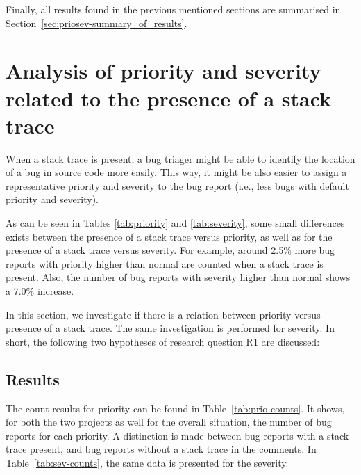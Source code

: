 Finally, all results found in the previous mentioned sections are summarised in Section~\ref{sec:priosev-summary_of_results}.

\section{Analysis of priority and severity related to the presence of a stack trace} %
\label{sec:analysis_of_priority_and_severity_related_to_the_presence_of_a_stack_trace}
When a stack trace is present, a bug triager might be able to identify the location of a bug in source code more easily. This way, it might be also easier to assign a representative priority and severity to the bug report (i.e., less bugs with default priority and severity).

As can be seen in Tables \ref{tab:priority} and \ref{tab:severity}, some small differences exists between the presence of a stack trace versus priority, as well as for the presence of a stack trace versus severity. For example, around 2.5\% more bug reports with priority higher than normal are counted when a stack trace is present. Also, the number of bug reports with severity higher than normal shows a 7.0\% increase.

In this section, we investigate if there is a relation between priority versus presence of a stack trace. The same investigation is performed for severity. In short, the following two hypotheses of research question R1 are discussed: 

\vspace{\baselineskip}
\hypaa{}

\vspace{\baselineskip}
\hypab{}
\vspace{\baselineskip}

\subsection{Results} %
The count results for priority can be found in Table~\ref{tab:prio-counts}. It shows, for both the two projects as well for the overall situation, the number of bug reports for each priority. A distinction is made between bug reports with a stack trace present, and bug reports without a stack trace in the comments. In Table~\ref{tab:sev-counts}, the same data is presented for the severity.


